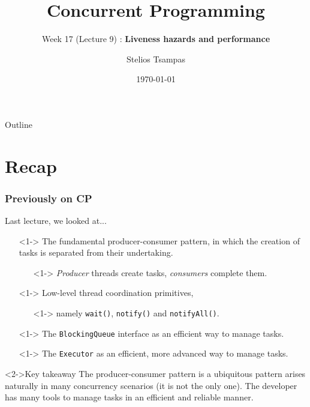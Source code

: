 \documentclass[xcolor={dvipsnames,svgnames},aspectratio=169]{beamer}
\title{Concurrent Programming}
\subtitle{Week 17 (Lecture 9) : \textbf{Liveness hazards and performance}}
\author{Stelios Tsampas}
\institute{
  \faEnvelope \; stelios@imada.sdu.dk
  \qquad
  \faGlobe \;
  \href{https://www.steliostsampas.com}{https://www.steliostsampas.com}
  \\\\\
  \faGithub \; stelios-tau/cp-2025
}
\date{\today}
\begin{document}
\frame{\titlepage}

\def\firstcircle{(0,0) circle (2cm)}
\def\secondcircle{(1.4,1.4) circle (2cm)}
\def\thirdcircle{(0:2.4) circle (2cm)}

\begin{frame}{Outline}
  \tableofcontents
\end{frame}

\section{Recap}

\begin{frame}[fragile]
  \frametitle{Previously on CP}

  Last lecture, we looked at...

  \begin{itemize}
  \item[\faBook]<1-> The fundamental producer-consumer pattern, in which the
    creation of tasks is separated from their undertaking.
    \begin{itemize}
    \item[\faBook]<1-> \emph{Producer} threads create tasks, \emph{consumers}
      complete them.
    \end{itemize}
  \item[\faBook]<1-> Low-level thread coordination primitives,
    \begin{itemize}
    \item[\faBook]<1-> namely \texttt{wait()}, \texttt{notify()} and
      \texttt{notifyAll()}.
    \end{itemize}
  \item[\faBook]<1-> The \texttt{BlockingQueue} interface as an efficient way to
    manage tasks.
  \item[\faBook]<1-> The \texttt{Executor} as an efficient, more advanced way to
    manage tasks.
  \end{itemize}

  \vspace{0.4cm}

  \begin{block}<2->{\faLightbulb \quad Key takeaway}
    The producer-consumer pattern is a ubiquitous pattern arises naturally in
    many concurrency scenarios (it is not the only one). The developer has many
    tools to manage tasks in an efficient and reliable manner.
  \end{block}

\end{frame}
\end{document}

